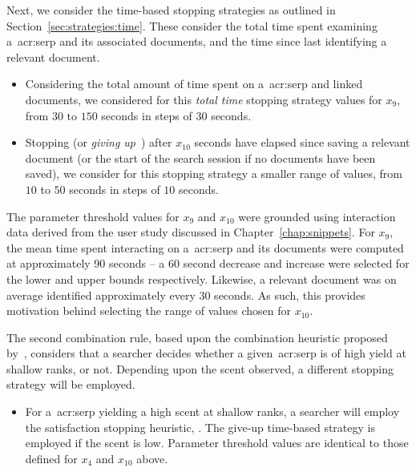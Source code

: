 Next, we consider the time-based stopping strategies as outlined in Section~\ref{sec:strategies:time}. These consider the total time spent examining a~\gls{acr:serp} and its associated documents, and the time since last identifying a relevant document.

\begin{itemize}
    \item{ Considering the total amount of time spent on a~\gls{acr:serp} and linked documents, we considered for this \emph{total time} stopping strategy values for $x_9$, from $30$ to $150$ seconds in steps of $30$ seconds.}
    
    \item{ Stopping (or \emph{giving up}~\citep{krebs1974leave_after_rule}) after $x_{10}$ seconds have elapsed since saving a relevant document (or the start of the search session if no documents have been saved), we consider for this stopping strategy a smaller range of values, from $10$ to $50$ seconds in steps of $10$ seconds.}
\end{itemize}

The parameter threshold values for $x_9$ and $x_{10}$ were grounded using interaction data derived from the user study discussed in Chapter~\ref{chap:snippets}. For $x_9$, the mean time spent interacting on a~\gls{acr:serp} and its documents were computed at approximately $90$ seconds -- a $60$ second decrease and increase were selected for the lower and upper bounds respectively. Likewise, a relevant document was on average identified approximately every $30$ seconds. As such, this provides motivation behind selecting the range of values chosen for $x_{10}$.

The second combination rule, based upon the combination heuristic proposed by~\cite{mcnair1982gut_mvt}, considers that a searcher decides whether a given~\gls{acr:serp} is of high yield at shallow ranks, or not. Depending upon the scent observed, a different stopping strategy will be employed.

\begin{itemize}
    \item{ For a~\gls{acr:serp} yielding a high scent at shallow ranks, a searcher will employ the satisfaction stopping heuristic, . The give-up time-based strategy  is employed if the scent is low. Parameter threshold values are identical to those defined for $x_4$ and $x_{10}$ above.}
\end{itemize}

